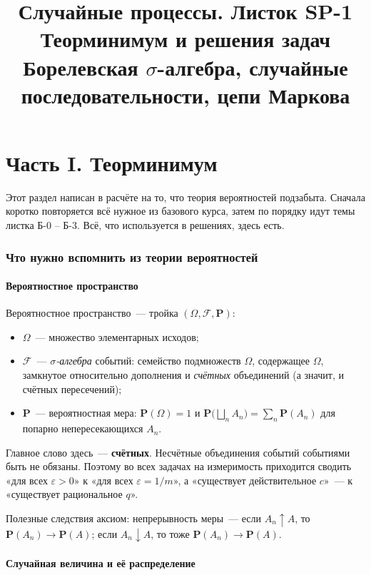 \documentclass[11pt,a4paper]{article}
\title{\textbf{Случайные процессы. Листок SP-1}\\[4pt]
\large Теорминимум и решения задач\\[2pt]
\normalsize Борелевская $\sigma$-алгебра, случайные последовательности, цепи Маркова}
\date{}
\theoremstyle{definition}
\newcommand{\PP}{\mathbf P}
\newcommand{\F}{\mathcal F}
\newcommand{\1}{\mathbf 1}
\begin{document}
\maketitle
\tableofcontents
\newpage

\part*{Часть I. Теорминимум}

Этот раздел написан в расчёте на то, что теория вероятностей подзабыта. Сначала
коротко повторяется всё нужное из базового курса, затем по порядку идут темы
листка Б-0 -- Б-3. Всё, что используется в решениях, здесь есть.

\section{Что нужно вспомнить из теории вероятностей}

\subsection{Вероятностное пространство}

Вероятностное пространство~--- тройка $(\Omega,\F,\PP)$:
\begin{itemize}[nosep]
\item $\Omega$~--- множество элементарных исходов;
\item $\F$~--- \emph{$\sigma$-алгебра} событий: семейство подмножеств $\Omega$,
содержащее $\Omega$, замкнутое относительно дополнения и \emph{счётных}
объединений (а значит, и счётных пересечений);
\item $\PP$~--- вероятностная мера: $\PP(\Omega)=1$ и
$\PP\bigl(\bigsqcup_n A_n\bigr)=\sum_n\PP(A_n)$ для попарно непересекающихся $A_n$.
\end{itemize}
Главное слово здесь~--- \textbf{счётных}. Несчётные объединения событий событиями
быть не обязаны. Поэтому во всех задачах на измеримость приходится сводить
«для всех $\varepsilon>0$» к «для всех $\varepsilon=1/m$», а «существует
действительное $c$»~--- к «существует рациональное $q$».

Полезные следствия аксиом: непрерывность меры~--- если $A_n\uparrow A$, то
$\PP(A_n)\to\PP(A)$; если $A_n\downarrow A$, то тоже $\PP(A_n)\to\PP(A)$.

\subsection{Случайная величина и её распределение}
\end{document}
